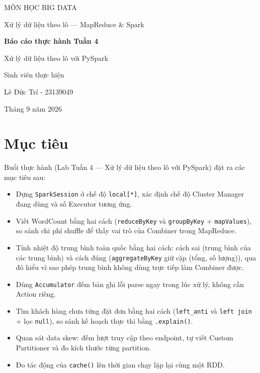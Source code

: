 \documentclass[12pt,a4paper,oneside]{article}
\begin{document}
\begin{titlepage}
\centering
{\large MÔN HỌC BIG DATA\par}
\vspace{0.4cm}
{\large Xử lý dữ liệu theo lô --- MapReduce \& Spark\par}
\vspace{3cm}
{\LARGE\bfseries Báo cáo thực hành Tuần 4\par}
\vspace{0.6cm}
{\Large Xử lý dữ liệu theo lô với PySpark\par}
\vspace{3cm}
{\large Sinh viên thực hiện\par}
{\large Lê Đức Trí - 23139049 \par}
\vfill
{\large Tháng 9 năm 2026\par}
\end{titlepage}

\tableofcontents
\newpage

\section{Mục tiêu}

Buổi thực hành (Lab Tuần 4 --- Xử lý dữ liệu theo lô với PySpark) đặt ra các mục tiêu sau:

\begin{itemize}
  \item Dựng \texttt{SparkSession} ở chế độ \texttt{local[*]}, xác định chế độ Cluster Manager đang dùng và số Executor tương ứng.
  \item Viết WordCount bằng hai cách (\texttt{reduceByKey} và \texttt{groupByKey} + \texttt{mapValues}), so sánh chi phí shuffle để thấy vai trò của Combiner trong MapReduce.
  \item Tính nhiệt độ trung bình toàn quốc bằng hai cách: cách sai (trung bình của các trung bình) và cách đúng (\texttt{aggregateByKey} giữ cặp (tổng, số lượng)), qua đó hiểu vì sao phép trung bình không dùng trực tiếp làm Combiner được.
  \item Dùng \texttt{Accumulator} đếm bản ghi lỗi parse ngay trong lúc xử lý, không cần Action riêng.
  \item Tìm khách hàng chưa từng đặt đơn bằng hai cách (\texttt{left\_anti} và \texttt{left join} + lọc \texttt{null}), so sánh kế hoạch thực thi bằng \texttt{.explain()}.
  \item Quan sát data skew: đếm lượt truy cập theo endpoint, tự viết Custom Partitioner và đo kích thước từng partition.
  \item Đo tác động của \texttt{cache()} lên thời gian chạy lặp lại cùng một RDD.
\end{itemize}
\end{document}
